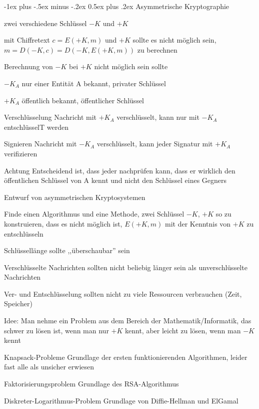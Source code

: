 \documentclass[a4paper]{article}
\makeatletter
\renewcommand{\section}{\@startsection{section}{1}{0mm}%
 {-1ex plus -.5ex minus -.2ex}%
 {0.5ex plus .2ex}%
 {\normalfont\large\bfseries}}
\makeatother
\begin{document}
\begin{multicols}{3}
      \section{Asymmetrische Kryptographie}
      \begin{itemize*}
            \item zwei verschiedene Schlüssel $-K$ und $+K$
            \item mit Chiffretext $c=E(+K, m)$ und $+K$ sollte es nicht möglich sein, $m=D(-K,c) =D(-K,E(+K,m))$ zu berechnen
            \item Berechnung von $-K$ bei $+K$ nicht möglich sein sollte
            \item $-K_A$ nur einer Entität A bekannt, privater Schlüssel
            \item $+K_A$ öffentlich bekannt, öffentlicher Schlüssel
            \begin{description*}
                  \item[Verschlüsselung] Nachricht mit $+K_A$ verschlüsselt, kann nur mit $-K_A$ entschlüsselT werden
                  \item[Signieren] Nachricht mit $-K_A$ verschlüsselt, kann jeder Signatur mit $+K_A$ verifizieren
                  \item[Achtung] Entscheidend ist, dass jeder nachprüfen kann, dass er wirklich den öffentlichen Schlüssel von A kennt und nicht den Schlüssel eines Gegners
            \end{description*}
            \item Entwurf von asymmetrischen Kryptosystemen
            \begin{itemize*}
                  \item Finde einen Algorithmus und eine Methode, zwei Schlüssel $-K$, $+K$ so zu konstruieren, dass es nicht möglich ist, $E(+K, m)$ mit der Kenntnis von $+K$ zu entschlüsseln
                  \item Schlüssellänge sollte ,,überschaubar'' sein
                  \item Verschlüsselte Nachrichten sollten nicht beliebig länger sein als unverschlüsselte Nachrichten
                  \item Ver- und Entschlüsselung sollten nicht zu viele Ressourcen verbrauchen (Zeit, Speicher)
                  \item Idee: Man nehme ein Problem aus dem Bereich der Mathematik/Informatik, das schwer zu lösen ist, wenn man nur $+K$ kennt, aber leicht zu lösen, wenn man $-K$ kennt
            \end{itemize*}
      \end{itemize*}
      \begin{description*}
            \item[Knapsack-Probleme] Grundlage der ersten funktionierenden Algorithmen, leider fast alle als unsicher erwiesen
            \item[Faktorisierungsproblem] Grundlage des RSA-Algorithmus
            \item[Diskreter-Logarithmus-Problem] Grundlage von Diffie-Hellman und ElGamal
      \end{description*}


\end{multicols}
\end{document}
